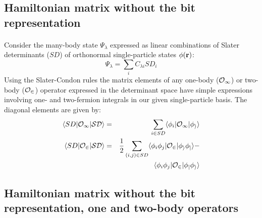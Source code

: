 \subsection*{Hamiltonian matrix without the bit representation}

\paragraph{}

Consider the many-body state $\Psi_{\lambda}$ expressed as linear combinations of
Slater determinants ($SD$) of orthonormal single-particle states $\phi({\bf r})$:
\begin{equation}
\Psi_{\lambda} = \sum_i C_{\lambda i} SD_i
\end{equation}
Using the Slater-Condon rules the matrix elements of any one-body
($\cal{O}_1$) or two-body ($\cal{O}_2$) operator expressed in the
determinant space have simple expressions involving one- and two-fermion
integrals in our given single-particle basis.
The diagonal elements are given by:
\begin{eqnarray}
  \langle SD | \cal{O}_1 | SD \rangle & = & \sum_{i \in SD} \langle \phi_i | \cal{O}_1 | \phi_i \rangle \\
  \langle SD | \cal{O}_2 | SD \rangle & = & \frac{1}{2} \sum_{(i,j) \in SD}  
      \langle \phi_i \phi_j | \cal{O}_2 | \phi_i \phi_j \rangle - \nonumber \\
 & & 
      \langle \phi_i \phi_j | \cal{O}_2 | \phi_j \phi_i \rangle \nonumber 
\end{eqnarray}



\subsection*{Hamiltonian matrix without the bit representation, one and two-body operators}

\paragraph{}

